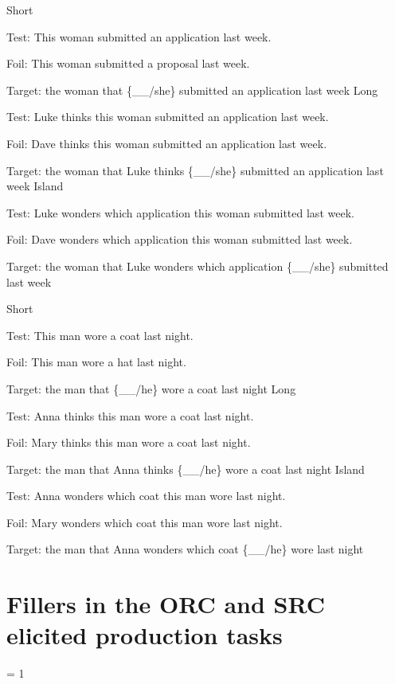 \pex %
\a Short\par\nobreak
Test: This woman submitted an application last week.\par\nobreak
Foil: This woman submitted a proposal last week.\par\nobreak
Target: the woman that \{\_\_/she\} submitted an application last week
\a Long\par\nobreak
Test: Luke thinks this woman submitted an application last week.\par\nobreak
Foil: Dave thinks this woman submitted an application last week.\par\nobreak
Target: the woman that Luke thinks \{\_\_/she\} submitted an application last week
\a Island\par\nobreak
Test: Luke wonders which application this woman submitted last week.\par\nobreak
Foil: Dave wonders which application this woman submitted last week.\par\nobreak
Target: the woman that Luke wonders which application \{\_\_/she\} submitted last week
\xe

\pex %
\a Short\par\nobreak
Test: This man wore a coat last night.\par\nobreak
Foil: This man wore a hat last night.\par\nobreak
Target: the man that \{\_\_/he\} wore a coat last night
\a Long\par\nobreak
Test: Anna thinks this man wore a coat last night.\par\nobreak
Foil: Mary thinks this man wore a coat last night.\par\nobreak
Target: the man that Anna thinks \{\_\_/he\} wore a coat last night
\a Island\par\nobreak
Test: Anna wonders which coat this man wore last night.\par\nobreak
Foil: Mary wonders which coat this man wore last night.\par\nobreak
Target: the man that Anna wonders which coat \{\_\_/he\} wore last night
\xe

\section{Fillers in the ORC and SRC elicited production tasks}

\excnt = 1

